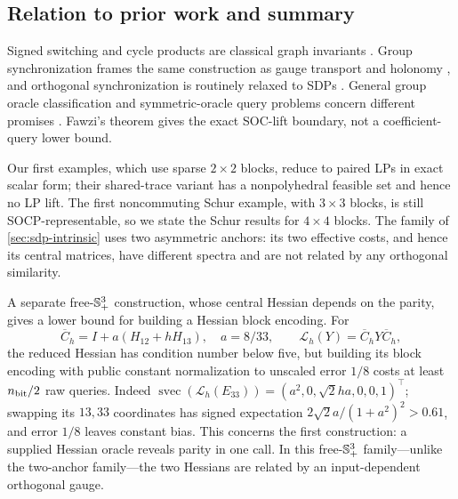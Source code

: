 \subsection{Relation to prior work and summary}
\label{sec:sdp-synthesis}

Signed switching and cycle products are classical graph invariants
\cite{kadyan2023-switching-equivalence-hermitian}.  Group synchronization
frames the same construction as gauge transport and holonomy
\cite{gao2019-the-geometry-of-synchronization-problems}, and orthogonal
synchronization is routinely relaxed to SDPs
\cite{ling2022-solving-orthogonal-group-synchronization-via}.  General group
oracle classification and symmetric-oracle query problems concern different
promises
\cite{zhandry2015-quantum-oracle-classification,
copeland2021-quantum-query-complexity-of-symmetric}.  Fawzi's theorem
gives the exact SOC-lift boundary, not a coefficient-query lower bound.

Our first examples, which use sparse $2\times2$ blocks, reduce to paired
LPs in exact scalar form; their shared-trace variant has a nonpolyhedral
feasible set and hence no LP lift.  The first
noncommuting Schur example, with $3\times3$ blocks, is still
SOCP-representable, so we state the Schur results for $4\times4$ blocks.
The family of \cref{sec:sdp-intrinsic} uses two asymmetric anchors: its two
effective costs, and hence its central matrices, have different spectra and are not related by
any orthogonal similarity.

A separate free-$\mathbb{S}_{+}^3$ construction, whose central Hessian depends on
the parity, gives a lower bound for building a Hessian block encoding.  For
\begin{equation}
 \overline C_h=I+a(H_{12}+hH_{13}),\quad a=8/33,
 \qquad\mathcal L_h(Y)=\overline C_hY\overline C_h,         \label{eq:sdp-hessian-precursor}
\end{equation}
the reduced Hessian has condition number below five, but building its block
encoding with public constant normalization to unscaled error $1/8$ costs at least $n_{\rm bit}/2$ raw queries.  Indeed
$\operatorname{svec}(\mathcal L_h(E_{33}))=(a^2,0,\sqrt2ha,0,0,1)^\top$;
swapping its $13,33$ coordinates has signed expectation
$2\sqrt2a/(1+a^2)^2>0.61$, and error $1/8$ leaves constant bias.  This
concerns the first construction: a supplied Hessian oracle reveals parity in
one call.  In this free-$\mathbb{S}_{+}^3$ family---unlike the two-anchor family---the
two Hessians are related by an input-dependent orthogonal gauge.

